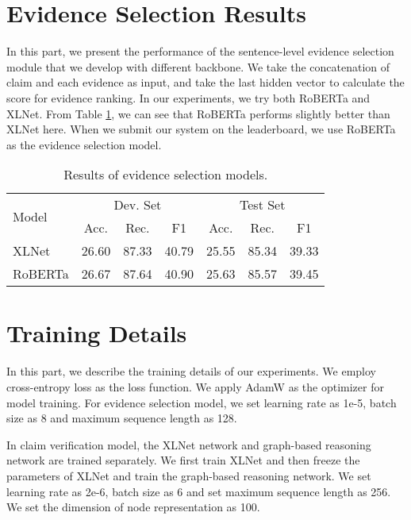 \documentclass[11pt,a4paper]{article}
\begin{document}
\section{Evidence Selection Results}
\label{appendix:evidence-selection}
In this part, we present the performance of the sentence-level evidence selection module that we develop with different backbone. 
We take the concatenation of claim and each evidence as input, and take the last hidden vector to calculate the score for evidence ranking. 
In our experiments, we try both RoBERTa and XLNet. 
From Table \ref{tab:evidence-table}, we can see that RoBERTa performs slightly better than XLNet here. When we submit our system on the leaderboard, we use RoBERTa as the evidence selection model.
\begin{table}[h]
	\small
	\begin{tabular}{l|ccc|ccc}
		\hline
		\multirow{2}{*}{Model} & \multicolumn{3}{c|}{Dev. Set} & \multicolumn{3}{c}{Test Set} \\ \cline{2-7} 
		& Acc.     & Rec.    & F1    & Acc.     & Rec.    & F1    \\ \hline
		XLNet       &   26.60       &   87.33  & 40.79   &  25.55 & 85.34 & 39.33 \\
		RoBERTa      & 26.67 & 87.64 &  40.90 & 25.63 & 85.57 & 39.45 \\ \hline
	\end{tabular}
	\caption{Results of evidence selection models.}
	\label{tab:evidence-table}
\end{table}

\section{Training Details}
In this part, we describe the
training details of our experiments. We employ cross-entropy loss as the loss function. We apply AdamW as the optimizer for model training. 
For evidence selection model, we set learning rate as 1e-5, batch size as 8 and maximum sequence length as 128.

In claim verification model, the XLNet network and graph-based reasoning network are trained separately. We first train XLNet and then freeze the parameters of XLNet and train the graph-based reasoning network. We set learning rate as 2e-6, batch size as 6 and set maximum sequence length as 256. We set the dimension of node representation as 100. 
\end{document}
